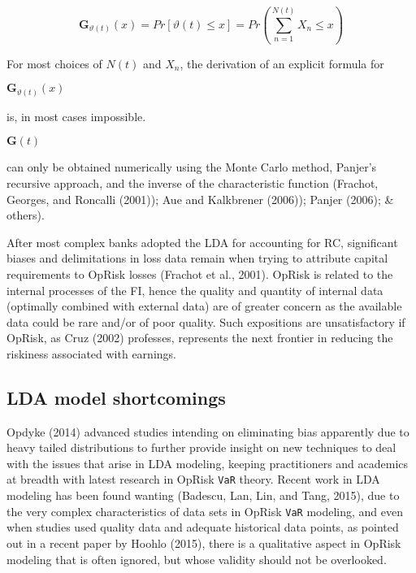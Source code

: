 \documentclass[]{DissertateUSU}
\begin{document}
\begin{equation}\label{eqn1}
\mathbf{G}_{\vartheta(t)}(x)=Pr[\vartheta(t)\leq x]=Pr\left(\sum_{n=1}^{N(t)}X_{n} \leq x\right)
\end{equation}

For most choices of \(N(t)\) and \(X_{n}\), the derivation of an
explicit formula for

\begin{math}\mathbf{G}_{\vartheta(t)}(x) \end{math}

is, in most cases impossible.

\begin{math} \mathbf{G}(t)\end{math}

can only be obtained numerically using the Monte Carlo method, Panjer's
recursive approach, and the inverse of the characteristic function
(Frachot, Georges, and Roncalli (2001)); Aue and Kalkbrener (2006));
Panjer (2006); \& others). \medskip

After most complex banks adopted the LDA for accounting for RC,
significant biases and delimitations in loss data remain when trying to
attribute capital requirements to OpRisk losses (Frachot et al., 2001).
OpRisk is related to the internal processes of the FI, hence the quality
and quantity of internal data (optimally combined with external data)
are of greater concern as the available data could be rare and/or of
poor quality. Such expositions are unsatisfactory if OpRisk, as Cruz
(2002) professes, represents the next frontier in reducing the riskiness
associated with earnings.

\subsection{LDA model shortcomings}
\label{ssec:LDA model shortcomings}

Opdyke (2014) advanced studies intending on eliminating bias apparently
due to heavy tailed distributions to further provide insight on new
techniques to deal with the issues that arise in LDA modeling, keeping
practitioners and academics at breadth with latest research in OpRisk
\texttt{VaR} theory. Recent work in LDA modeling has been found wanting
(Badescu, Lan, Lin, and Tang, 2015), due to the very complex
characteristics of data sets in OpRisk \texttt{VaR} modeling, and even
when studies used quality data and adequate historical data points, as
pointed out in a recent paper by Hoohlo (2015), there is a qualitative
aspect in OpRisk modeling that is often ignored, but whose validity
should not be overlooked. \medskip
\end{document}
